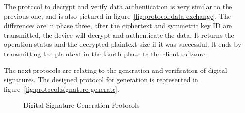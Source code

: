 The protocol to decrypt and verify data authentication is very similar to the previous one, and is also pictured in figure~\ref{fig:protocol:data-exchange}. The differences are in phase three, after the ciphertext and symmetric key ID are transmitted, the device will decrypt and authenticate the data. It returns the operation status and the decrypted plaintext size if it was successful. It ends by transmitting the plaintext in the fourth phase to the client software.

\hfill
\hfill

The next protocols are relating to the generation and verification of digital signatures.
The designed protocol for generation is represented in figure~\ref{fig:protocol:signature-generate}.
\begin{figure}[h!]
	\centering     %
	\caption{Digital Signature Generation Protocols}
\end{figure}

